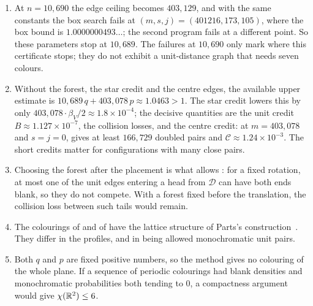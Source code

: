 \documentclass[11pt,colorlinks]{charlie}
\newcommand{\cD}{\mathcal{D}}
\begin{document}
\begin{enumerate}
\item At $n=10{,}690$ the edge ceiling becomes $403{,}129$, and with the same constants the box search fails at $(m,s,j)=(401216,173,105)$, where the box bound is $1.0000000493\ldots$; the second program fails at a different point. So these parameters stop at $10{,}689$. The failures at $10{,}690$ only mark where this certificate stops; they do not exhibit a unit-distance graph that needs seven colours.
\item Without the forest, the star credit and the centre edges, the available upper estimate is $10{,}689\,q+403{,}078\,p\approx1.0463>1$. The star credit lowers this by only $403{,}078\cdot\beta_V/2\approx1.8\times10^{-4}$; the decisive quantities are the unit credit $B\approx1.127\times10^{-7}$, the collision losses, and the centre credit: at $m=403{,}078$ and $s=j=0$,  gives at least $166{,}729$ doubled pairs and $\mathcal C\approx1.24\times10^{-3}$. The short credits matter for configurations with many close pairs.
\item Choosing the forest after the placement is what allows : for a fixed rotation, at most one of the unit edges entering a head from $\cD$ can have both ends blank, so they do not compete. With a forest fixed before the translation, the collision loss between such tails would remain.
\item The colourings of  and of  have the lattice structure of Parts's construction~\cite{Parts}. They differ in the profiles, and in being allowed monochromatic unit pairs.
\item Both $q$ and $p$ are fixed positive numbers, so the method gives no colouring of the whole plane. If a sequence of periodic colourings had blank densities and monochromatic probabilities both tending to $0$, a compactness argument would give $\chi(\mathbb{R}^2)\le6$.
\end{enumerate}

\appendix
\end{document}
